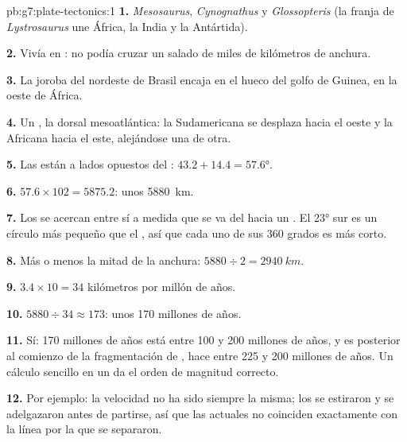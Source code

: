\begin{solution}{pb:g7:plate-tectonics:1}
\textbf{1.} \emph{Mesosaurus}, \emph{Cynognathus} y \emph{Glossopteris}
(la franja de \emph{Lystrosaurus} une África, la India y la Antártida).

\textbf{2.} Vivía en : no podía cruzar un  salado de miles
de kilómetros de anchura.

\textbf{3.} La joroba del nordeste de Brasil encaja en el hueco del golfo de
Guinea, en la  oeste de África.

\textbf{4.} Un , la dorsal mesoatlántica: la 
Sudamericana se desplaza hacia el oeste y la  Africana hacia el este,
alejándose una de otra.

\textbf{5.} Las  están a lados opuestos del :
$43.2 + 14.4 = \ang{57.6}$.

\textbf{6.} $57.6 \times 102 = 5875.2$: unos \qty{5880}{km}.

\textbf{7.} Los  se acercan entre sí a medida que se va del
 hacia un . El  \ang{23} sur es un círculo más pequeño
que el , así que cada uno de sus 360 grados es más corto.

\textbf{8.} Más o menos la mitad de la anchura: $5880 \div 2 = \qty{2940}{km}$.

\textbf{9.} $3.4 \times 10 = 34$ kilómetros por millón de años.

\textbf{10.} $5880 \div 34 \approx 173$: unos 170 millones de años.

\textbf{11.} Sí: 170 millones de años está entre 100 y 200 millones de
años, y es posterior al comienzo de la fragmentación de , hace entre
225 y 200 millones de años. Un cálculo sencillo en un  da el orden de
magnitud correcto.

\textbf{12.} Por ejemplo: la velocidad no ha sido siempre la misma; los
 se estiraron y se adelgazaron antes de partirse, así que las
 actuales no coinciden exactamente con la línea por la que se
separaron.
\end{solution}
